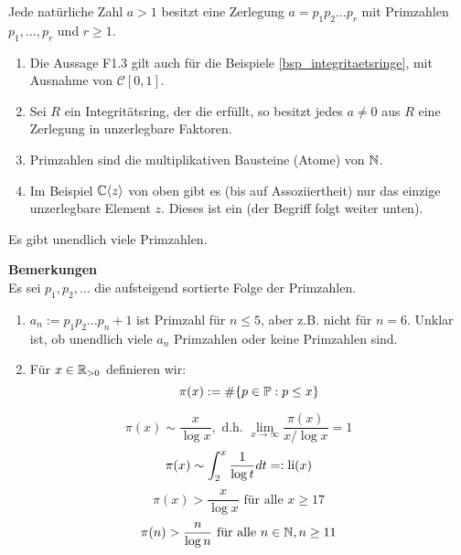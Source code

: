 \setcounter{countfalko}{2}
\begin{falko} \label{F1.3'}
	Jede natürliche Zahl $a > 1$ besitzt eine Zerlegung $a = p_1p_2 \dots p_r$ mit Primzahlen $p_1,\dots,p_r$ und $r \geq 1$.
\end{falko}

	\begin{enumerate}[1)]
		\item Die Aussage F1.3 gilt auch für die Beispiele \ref{bsp_integritaetsringe}, mit Ausnahme von $\mathcal{C}[0,1]$.
		\item Sei $R$ ein Integritätsring, der die  erfüllt, so besitzt jedes $a \neq 0$ aus $R$ eine Zerlegung in unzerlegbare Faktoren.
		\item Primzahlen sind die multiplikativen Bausteine (Atome) von $\mathbb{N}$.
		\item Im Beispiel $\mathbb{C}\langle z\rangle$ von oben gibt es (bis auf Assoziiertheit) nur das einzige unzerlegbare Element $z$. Dieses ist ein  (der Begriff folgt weiter unten).
	\end{enumerate}
	
\begin{satz} \label{satz_1.1}
	Es gibt unendlich viele Primzahlen.
\end{satz}

\textbf{Bemerkungen} \\
	Es sei $p_1,p_2,\dots$ die aufsteigend sortierte Folge der Primzahlen.
	\begin{enumerate}[1)]
		\item $a_n := p_1p_2\dots p_n +1$ ist Primzahl für $n \leq 5$, aber z.B. nicht für $n = 6$. Unklar ist, ob unendlich viele $a_n$ Primzahlen oder keine Primzahlen sind.
		\item Für $x \in \mathbb{R}_{>0}$ definieren wir:
		\[ \pi(x) := \# \{p \in \mathbb{P} : p \leq x\}\]
	\end{enumerate}

	\begin{equation}
		\pi(x) \sim \frac{x}{\log x}, \text{ d.h. } \lim\limits_{x \rightarrow \infty} \frac{\pi(x)}{x / \log x} = 1 \label{eq_primzahlsatz1}
	\end{equation}
	\begin{equation}
		\pi(x) \sim \int_{2}^{x} \frac{1}{\log t} dt =: \operatorname{li}(x) \label{eq_primzahlsatz_2}
	\end{equation}
	\begin{equation}
	\pi(x) > \frac{x}{\log x} \text{ für alle } x \geq 17 \label{eq_primzahlsatz_3}
	\end{equation}
	\begin{equation}
	\pi(n) > \frac{n}{\log n} \text{ für alle } n \in \mathbb{N}, n \geq 11 \label{eq_primzahlsatz_4}
	\end{equation}
	
